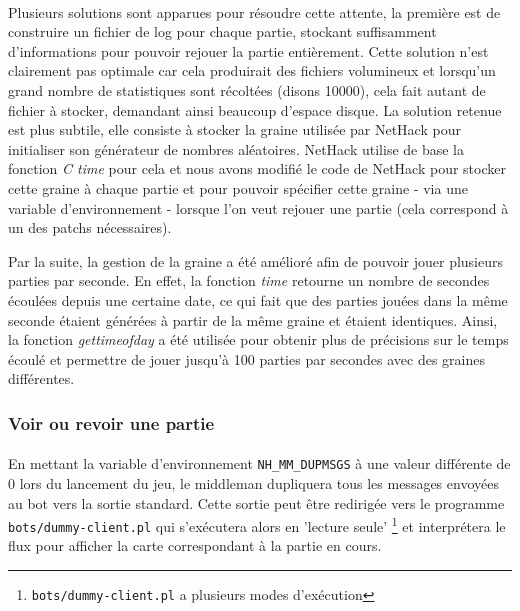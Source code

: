 \documentclass[a4paper,12pt]{article}
\begin{document}
\paragraph{}
Plusieurs solutions sont apparues pour résoudre cette attente, la première est
de construire un fichier de log pour chaque partie, stockant suffisamment
d'informations pour pouvoir rejouer la partie entièrement. Cette solution
n'est clairement pas optimale car cela produirait des fichiers volumineux et
lorsqu'un grand nombre de statistiques sont récoltées (disons 10000), cela
fait autant de fichier à stocker, demandant ainsi beaucoup d'espace disque.
La solution retenue est plus subtile, elle consiste à stocker la graine
utilisée par NetHack pour initialiser son générateur de nombres aléatoires.
NetHack utilise de base la fonction {\em C time} pour cela et nous avons
modifié le code de NetHack pour stocker cette graine à chaque partie et pour
pouvoir spécifier cette graine - via une variable d'environnement - lorsque
l'on veut rejouer une partie (cela correspond à un des patchs nécessaires).

Par la suite, la gestion de la graine a été amélioré afin de pouvoir jouer
plusieurs parties par seconde. En effet, la fonction {\em time} retourne un
nombre de secondes écoulées depuis une certaine date, ce qui fait que
des parties jouées dans la même seconde étaient générées à partir de la même
graine et étaient identiques. Ainsi, la fonction {\em gettimeofday} a été
utilisée pour obtenir plus de précisions sur le temps écoulé et permettre de
jouer jusqu'à 100 parties par secondes avec des graines différentes.

\subsubsection{Voir ou revoir une partie}

\paragraph{}
En mettant la variable d'environnement \verb!NH_MM_DUPMSGS! à une valeur
différente de 0 lors du lancement du jeu, le middleman dupliquera tous les
messages envoyées au bot vers la sortie standard. Cette sortie peut être
redirigée vers le programme \verb!bots/dummy-client.pl! qui s'exécutera alors en
'lecture seule' \footnote{\verb!bots/dummy-client.pl! a plusieurs modes
d'exécution} et interprétera le flux pour afficher la carte correspondant à
la partie en cours.
\end{document}
